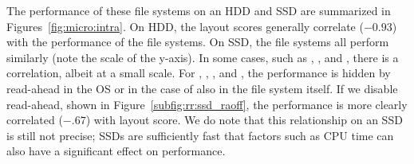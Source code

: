 

The performance of these file systems on an HDD and SSD are summarized in
Figures~\ref{fig:micro:intra}. On HDD, the layout scores generally correlate
($-0.93$) with the performance of the file systems.
On SSD, the file systems all perform similarly (note the scale of the y-axis).
In some cases, such as \xfs, \ext, and \zfs, there is a correlation, albeit at
a small scale.  For \btrfs, \ext, \xfs, and \ftwofs, the performance is hidden
by read-ahead in the OS or in the case of \btrfs also in the file system
itself. If we disable read-ahead, shown in Figure~\ref{subfig:rr:ssd_raoff}, the
performance is more clearly correlated ($-.67$) with layout score.  We do
note that this relationship on an SSD is still not precise; SSDs are
sufficiently fast that factors such as CPU time can also have a significant
effect on performance.


